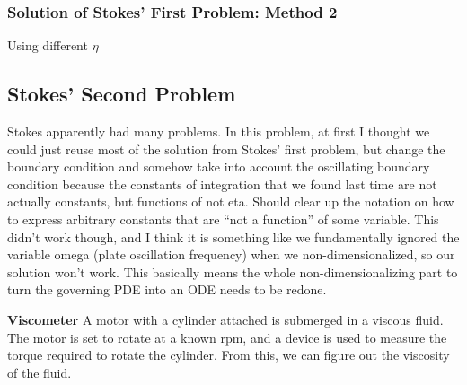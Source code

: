 \subsubsection{Solution of Stokes' First Problem: Method 2}

Using different $\eta$

\subsection{Stokes' Second Problem}

Stokes apparently had many problems.
In this problem, at first I thought we could just reuse most of the solution from Stokes' first problem, but change the boundary condition and somehow take into account the oscillating boundary condition because the constants of integration that we found last time are not actually constants, but functions of not eta.
Should clear up the notation on how to express arbitrary constants that are ``not a function'' of some variable.
This didn't work though, and I think it is something like we fundamentally ignored the variable omega (plate oscillation frequency) when we non-dimensionalized, so our solution won't work.
This basically means the whole non-dimensionalizing part to turn the governing PDE into an ODE needs to be redone.

\begin{figure}[H]
  \begin{center}
  \end{center}
\end{figure}

\begin{example}
  \textbf{Viscometer}
  A motor with a  cylinder attached is submerged in a viscous fluid.
  The motor is set to rotate at a known rpm, and a device is used to measure the torque required to rotate the cylinder.
  From this, we can figure out the viscosity of the fluid.
\end{example}

